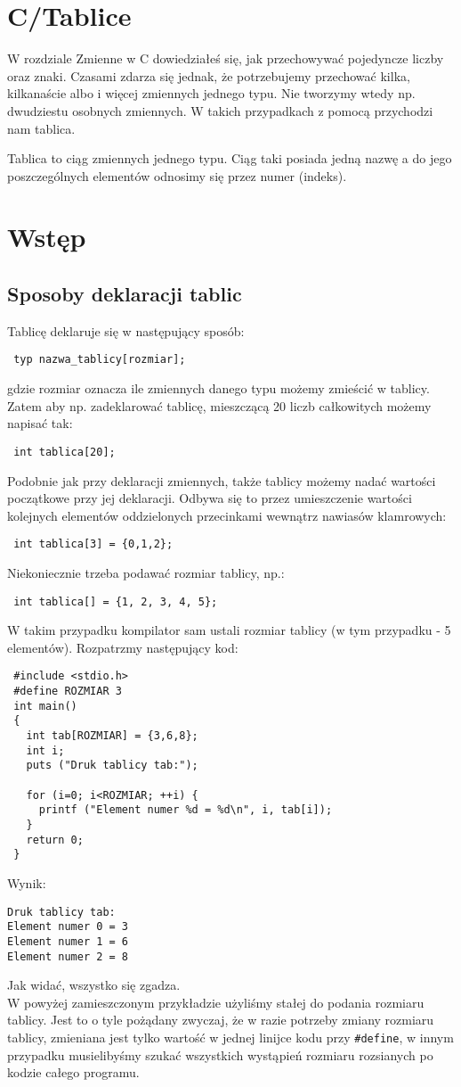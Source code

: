 \documentclass[11pt,a4paper]{article}
\author{Krzysztof Stasiowski}
\begin{document}
\section*{C/Tablice}
W rozdziale Zmienne w C dowiedziałeś się, jak przechowywać pojedyncze liczby oraz znaki. Czasami zdarza się jednak, że potrzebujemy przechować kilka, kilkanaście albo i więcej zmiennych jednego typu. Nie tworzymy wtedy np. dwudziestu osobnych zmiennych. W takich przypadkach z pomocą przychodzi nam tablica.

Tablica to ciąg zmiennych jednego typu. Ciąg taki posiada jedną nazwę a do jego poszczególnych elementów odnosimy się przez numer (indeks).
\section*{Wstęp}
\subsection*{Sposoby deklaracji tablic}
Tablicę deklaruje się w następujący sposób:
\begin{lstlisting}
 typ nazwa_tablicy[rozmiar];
\end{lstlisting}
gdzie rozmiar oznacza ile zmiennych danego typu możemy zmieścić w tablicy. Zatem aby np. zadeklarować tablicę, mieszczącą 20 liczb całkowitych możemy napisać tak:
\begin{lstlisting}
 int tablica[20];
\end{lstlisting}
Podobnie jak przy deklaracji zmiennych, także tablicy możemy nadać wartości początkowe przy jej deklaracji. Odbywa się to przez umieszczenie wartości kolejnych elementów oddzielonych przecinkami wewnątrz nawiasów klamrowych:
\begin{lstlisting}
 int tablica[3] = {0,1,2};
\end{lstlisting}
Niekoniecznie trzeba podawać rozmiar tablicy, np.:
\begin{lstlisting}
 int tablica[] = {1, 2, 3, 4, 5};
\end{lstlisting}
W takim przypadku kompilator sam ustali rozmiar tablicy (w tym przypadku - 5 elementów).
Rozpatrzmy następujący kod:
\begin{lstlisting}
 #include <stdio.h>
 #define ROZMIAR 3
 int main()
 {
   int tab[ROZMIAR] = {3,6,8};
   int i;
   puts ("Druk tablicy tab:");
 
   for (i=0; i<ROZMIAR; ++i) {
     printf ("Element numer %d = %d\n", i, tab[i]);
   }
   return 0;
 }
\end{lstlisting}
Wynik:
\begin{lstlisting}
Druk tablicy tab:
Element numer 0 = 3
Element numer 1 = 6
Element numer 2 = 8
\end{lstlisting}
Jak widać, wszystko się zgadza.\\
W powyżej zamieszczonym przykładzie użyliśmy stałej do podania rozmiaru tablicy. Jest to o tyle pożądany zwyczaj, że w razie potrzeby zmiany rozmiaru tablicy, zmieniana jest tylko wartość w jednej linijce kodu przy \lstinline!#define!, w innym przypadku musielibyśmy szukać wszystkich wystąpień rozmiaru rozsianych po kodzie całego programu.
\end{document}
